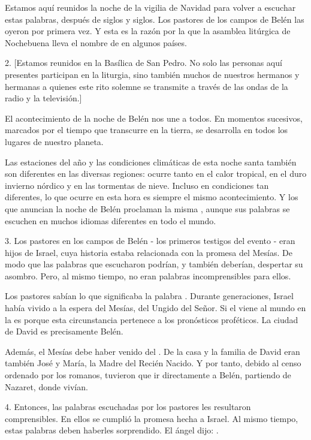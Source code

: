 \begin{body}
\begin{body}
		Estamos aquí reunidos la noche de la vigilia de Navidad para volver a escuchar estas palabras, después de siglos y siglos. Los pastores de los campos de Belén las oyeron por primera vez. Y esta es la razón por la que la asamblea litúrgica de Nochebuena lleva el nombre de  en algunos países.

		2. {[}Estamos reunidos en la Basílica de San Pedro. No solo las personas aquí presentes participan en la liturgia, sino también muchos de nuestros hermanos y hermanas a quienes este rito solemne se transmite a través de las ondas de la radio y la televisión.{]}

		El acontecimiento de la noche de Belén nos une a todos. En momentos sucesivos, marcados por el tiempo que transcurre en la tierra, se desarrolla en todos los lugares de nuestro planeta.

		Las estaciones del año y las condiciones climáticas de esta noche santa también son diferentes en las diversas regiones: ocurre tanto en el calor tropical, en el duro invierno nórdico y en las tormentas de nieve. Incluso en condiciones tan diferentes, lo que ocurre en esta hora es siempre el mismo acontecimiento. Y los que anuncian la noche de Belén proclaman la misma , aunque sus palabras se escuchen en muchos idiomas diferentes en todo el mundo.

		3. Los pastores en los campos de Belén - los primeros testigos del evento - eran hijos de Israel, cuya historia estaba relacionada con la promesa del Mesías. De modo que las palabras que escucharon podrían, y también deberían, despertar su asombro. Pero, al mismo tiempo, no eran palabras incomprensibles para ellos.

		Los pastores sabían lo que significaba la palabra . Durante generaciones, Israel había vivido a la espera del Mesías, del Ungido del Señor. Si el  viene al mundo en la  es porque esta circunstancia pertenece a los pronósticos proféticos. La ciudad de David es precisamente Belén.

		Además, el Mesías debe haber venido del . De la casa y la familia de David eran también José y María, la Madre del Recién Nacido. Y por tanto, debido al censo ordenado por los romanos, tuvieron que ir directamente a Belén, partiendo de Nazaret, donde vivían.

		4. Entonces, las palabras escuchadas por los pastores les resultaron comprensibles. En ellos se cumplió la promesa hecha a Israel. Al mismo tiempo, estas palabras deben haberles sorprendido. El ángel dijo: .


\end{body}
\end{body}
